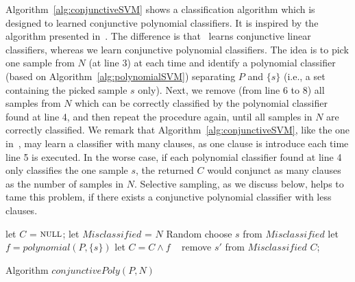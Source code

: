 Algorithm~\ref{alg:conjunctiveSVM} shows a classification algorithm which is designed to learned conjunctive polynomial classifiers.
It is inspired by the algorithm presented in~\cite{sharma2012interpolants}. The difference is that~\cite{sharma2012interpolants} learns conjunctive linear classifiers, whereas we learn conjunctive polynomial classifiers. The idea is to pick one sample from $N$ (at line 3) at each time and identify a polynomial classifier (based on Algorithm~\ref{alg:polynomialSVM}) separating $P$ and $\{s\}$ (i.e., a set containing the picked sample $s$ only). Next, we remove (from line 6 to 8) all samples from $N$ which can be correctly classified by the polynomial classifier found at line 4, and then repeat the procedure again, until all samples in $N$ are correctly classified.
We remark that Algorithm~\ref{alg:conjunctiveSVM}, like the one in~\cite{sharma2012interpolants}, may learn a classifier with many clauses, as one clause is introduce each time line 5 is executed. In the worse case, if each polynomial classifier found at line 4 only classifies the one sample $s$, the returned $C$ would conjunct as many clauses as the number of samples in $N$. Selective sampling, as we discuss below, helps to tame this problem, if there exists a conjunctive polynomial classifier with less clauses.

\begin{algorithm}[t]
\SetAlgoVlined
\Indm
\Indp
    let $C$ = $\textsc{null}$; let $\mathit{Misclassified}$ = $N$\;
     {
        Random choose $s$ from $\mathit{Misclassified}$\;
        let $f = \mathit{polynomial}(P, \{s\})$\;
        let $C = C \land f$\;
         {\
             {
                remove $s'$ from $\mathit{Misclassified}$\;
            }
        }
    }
    \Return $C$;
\caption{Algorithm $\mathit{conjunctivePoly}(P, N)$}
\label{alg:conjunctiveSVM}
\end{algorithm}



